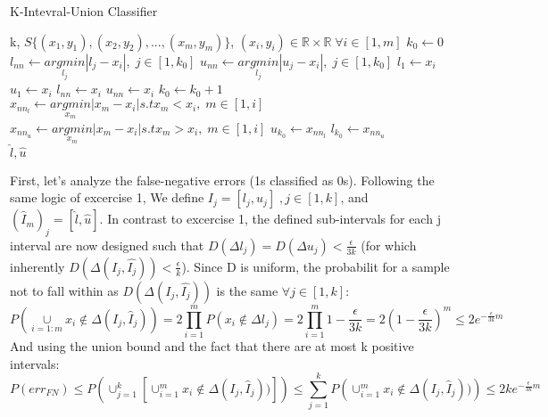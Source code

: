 \begin{algorithm}
    \caption{K-Intevral-Union Classifier}\label{alg:cap}
    \begin{algorithmic}
        \Require k, $S\{(x_1, y_1), (x_2, y_2), ..., (x_m, y_m)\}$, $(x_i, y_i) \in \mathbb{R} \times \mathbb{R} \;  \forall i \in [1, m]$
        \State $k_0 \gets 0$
            \State $l_{nn} \gets \underset{l_j}{argmin} |l_j - x_i|, \; j\in[1, k_0]$
            \State $u_{nn} \gets \underset{l_j}{argmin} |u_j - x_i|, \; j\in[1, k_0]$
                    \State $l_1 \gets x_i$
                    \State $u_1 \gets x_i$
                \Else
                        \State $l_{nn} \gets x_i$
                    \EndIf
                        \State $u_{nn} \gets x_i$
                    \EndIf
                \EndIf
            \Else
                 
                    \State $k_0 \gets k_0 + 1$
                    \State $x_{nn_l} \gets \underset{x_m}{argmin} |x_m - x_i| s.t x_m < x_i, \; m\in[1, i]$
                    \State $x_{nn_u} \gets \underset{x_m}{argmin} |x_m - x_i| s.t x_m > x_i, \; m\in[1, i]$
                    \State $u_{k_0} \gets x_{nn_l}$
                    \State $l_{k_0} \gets x_{nn_u}$
                \EndIf
            \EndIf
        \EndFor \\
    \Return $\hat{l}, \hat{u}$
    \end{algorithmic}
\end{algorithm}

First, let's analyze the false-negative errors (1s classified as 0s).
Following the same logic of excercise 1, We define $I_j = [l_j, u_j] \;, j\in [1, k]$, and $(\hat{I}_m)_j = [\hat{l}, \hat{u}]$.
In contrast to excercise 1, the defined sub-intervals for each j interval are now designed such that $D(\Delta l_j) = D(\Delta u_j) < \frac{\epsilon}{3k}$
(for which inherently $D(\Delta(I_j, \hat{I_j})) < \frac{\epsilon}{k}$). Since D is uniform, the probabilit for a sample not to fall within as $D(\Delta(I_j, \hat{I_j}))$ is the same $\forall j\in[1, k]$:
\begin{equation*}
    P(\underset{i=1:m}{\cup} x_i \notin \Delta(I_j, \hat{I}_j)) = 2\prod_{i=1}^{m}P(x_i \notin \Delta l_j) 
    = 2\prod_{i=1}^{m} 1-\frac{\epsilon}{3k}= 2(1-\frac{\epsilon}{3k})^m \leq 2e^{-\frac{\epsilon}{3k}m}
\end{equation*}
And using the union bound and the fact that there are at most k positive intervals:
\begin{equation*}
    P(err_{FN}) \leq P\left(\cup_{j=1}^{k} \left[ \cup_{i=1}^{m} x_i \notin \Delta(I_j, \hat{I}_j)) \right]\right) \leq \sum_{j=1}^{k} P\left(\cup_{i=1}^{m} x_i \notin \Delta(I_j, \hat{I}_j))\right) \leq 2ke^{-\frac{\epsilon}{3k}m}
\end{equation*}


